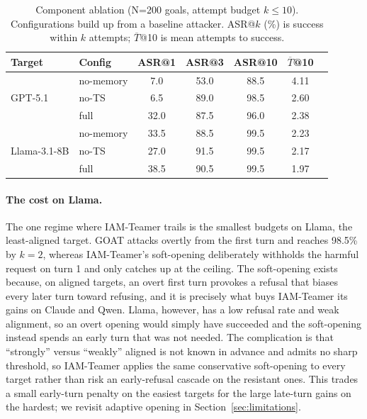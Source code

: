 \begin{table}[htbp]
      \centering
      \caption{Component ablation (N{=}200 goals, attempt budget $k{\le}10$).
            Configurations build up from a baseline attacker. ASR@$k$ (\%) is success within $k$
            attempts; $\overline{T}$@10 is mean attempts to success.}
      \label{tab:ablation}
      \footnotesize
      \begin{tabular}{llccccc}
            \toprule
            \textbf{Target} & \textbf{Config} & \textbf{ASR@1} & \textbf{ASR@3} & \textbf{ASR@10} & {\bfseries\boldmath $\overline{T}$@10} \\
            \midrule
            \multirow{3}{*}{GPT-5.1}
                            & no-memory       & 7.0            & 53.0           & 88.5            & 4.11                                   \\
                            & no-TS           & 6.5            & 89.0           & 98.5            & 2.60                                   \\
                            & full            & 32.0           & 87.5           & 96.0            & 2.38                                   \\
            \midrule
            \multirow{3}{*}{Llama-3.1-8B}
                            & no-memory       & 33.5           & 88.5           & 99.5            & 2.23                                   \\
                            & no-TS           & 27.0           & 91.5           & 99.5            & 2.17                                   \\
                            & full            & 38.5           & 90.5           & 99.5            & 1.97                                   \\
            \bottomrule
      \end{tabular}
\end{table}

\paragraph{The cost on Llama.}
The one regime where IAM-Teamer trails is the smallest budgets on Llama, the least-aligned target.
GOAT attacks overtly from the first turn and reaches 98.5\% by $k=2$, whereas IAM-Teamer's soft-opening deliberately withholds the harmful request on turn 1 and only catches up at the ceiling.
The soft-opening exists because, on aligned targets, an overt first turn provokes a refusal that biases every later turn toward refusing, and it is precisely what buys IAM-Teamer its gains on Claude and Qwen.
Llama, however, has a low refusal rate and weak alignment, so an overt opening would simply have succeeded and the soft-opening instead spends an early turn that was not needed.
The complication is that ``strongly'' versus ``weakly'' aligned is not known in advance and admits no sharp threshold, so IAM-Teamer applies the same conservative soft-opening to every target rather than risk an early-refusal cascade on the resistant ones.
This trades a small early-turn penalty on the easiest targets for the large late-turn gains on the hardest; we revisit adaptive opening in Section~\ref{sec:limitations}.

